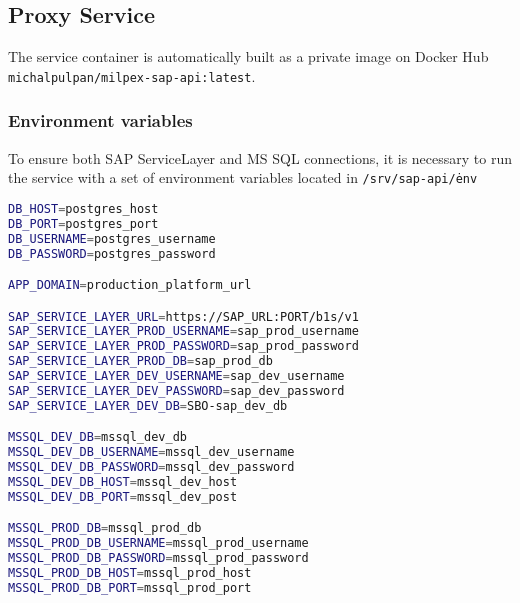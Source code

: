 \subsection{Proxy Service}
The service container is automatically built as a private image on Docker Hub \texttt{michalpulpan/milpex-sap-api:latest}.

\subsubsection{Environment variables}
To ensure both SAP ServiceLayer and MS SQL connections, it is necessary to run the service with a set of environment variables located in \texttt{/srv/sap-api/\.env}
\begin{lstlisting}[language=bash,caption={SAP Business One ServiceLayer Proxy with database connector environment variables setup}]
DB_HOST=postgres_host
DB_PORT=postgres_port
DB_USERNAME=postgres_username
DB_PASSWORD=postgres_password

APP_DOMAIN=production_platform_url

SAP_SERVICE_LAYER_URL=https://SAP_URL:PORT/b1s/v1
SAP_SERVICE_LAYER_PROD_USERNAME=sap_prod_username
SAP_SERVICE_LAYER_PROD_PASSWORD=sap_prod_password
SAP_SERVICE_LAYER_PROD_DB=sap_prod_db
SAP_SERVICE_LAYER_DEV_USERNAME=sap_dev_username
SAP_SERVICE_LAYER_DEV_PASSWORD=sap_dev_password
SAP_SERVICE_LAYER_DEV_DB=SBO-sap_dev_db

MSSQL_DEV_DB=mssql_dev_db
MSSQL_DEV_DB_USERNAME=mssql_dev_username
MSSQL_DEV_DB_PASSWORD=mssql_dev_password
MSSQL_DEV_DB_HOST=mssql_dev_host
MSSQL_DEV_DB_PORT=mssql_dev_post

MSSQL_PROD_DB=mssql_prod_db
MSSQL_PROD_DB_USERNAME=mssql_prod_username
MSSQL_PROD_DB_PASSWORD=mssql_prod_password
MSSQL_PROD_DB_HOST=mssql_prod_host
MSSQL_PROD_DB_PORT=mssql_prod_port
\end{lstlisting}


